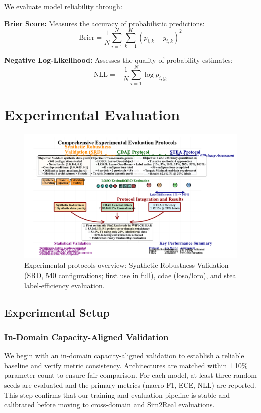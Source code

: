 \documentclass[journal]{IEEEtran}
\begin{document}
We evaluate model reliability through:

\textbf{Brier Score:} Measures the accuracy of probabilistic predictions:
\begin{equation}
\text{Brier} = \frac{1}{N} \sum_{i=1}^{N} \sum_{k=1}^{K} (p_{i,k} - y_{i,k})^2
\end{equation}

\textbf{Negative Log-Likelihood:} Assesses the quality of probability estimates:
\begin{equation}
\text{NLL} = -\frac{1}{N} \sum_{i=1}^{N} \log p_{i,y_i}
\end{equation}

\section{Experimental Evaluation}

\begin{figure}[t]
\centering
\includegraphics[width=\columnwidth]{figures/figure4_experimental_overview.pdf}
\caption{Experimental protocols overview: Synthetic Robustness Validation (SRD, 540 configurations; first use in full), \gls{cdae} (\gls{loso}/\gls{loro}), and \gls{stea} label-efficiency evaluation.}
\label{fig:protocols}
\end{figure}

\subsection{Experimental Setup}

\subsubsection{In-Domain Capacity-Aligned Validation}
We begin with an in-domain capacity-aligned validation to establish a reliable baseline and verify metric consistency. Architectures are matched within ±10\% parameter count to ensure fair comparison. For each model, at least three random seeds are evaluated and the primary metrics (macro F1, ECE, NLL) are reported. This step confirms that our training and evaluation pipeline is stable and calibrated before moving to cross-domain and Sim2Real evaluations.
\end{document}
